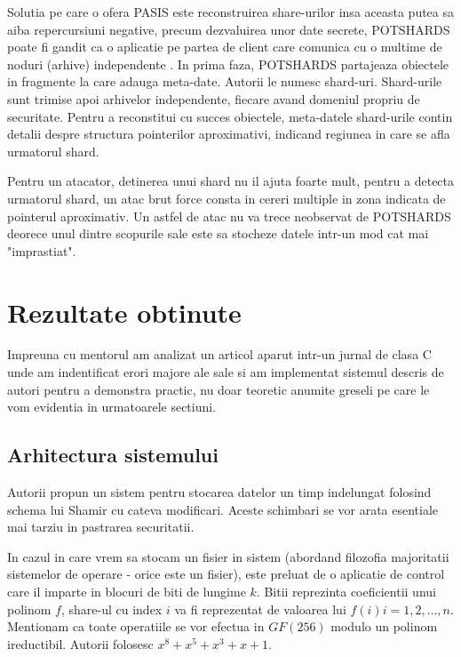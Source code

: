 \documentclass{llncs}
\begin{document}
Solutia pe care o ofera PASIS este reconstruirea share-urilor insa aceasta putea sa aiba repercursiuni negative, precum dezvaluirea unor date secrete,
POTSHARDS poate fi gandit ca o aplicatie pe partea de client care comunica cu o multime de noduri (arhive) independente . In prima faza, POTSHARDS partajeaza obiectele in fragmente la care adauga meta-date. Autorii le numesc shard-uri. Shard-urile sunt trimise apoi arhivelor independente, fiecare avand domeniul propriu de securitate. Pentru a reconstitui cu succes obiectele, meta-datele shard-urile contin detalii despre structura pointerilor aproximativi, indicand regiunea in care se afla urmatorul shard.

Pentru un atacator, detinerea unui shard nu il ajuta foarte mult, pentru a detecta urmatorul shard, un atac brut force consta in cereri multiple in zona indicata de pointerul aproximativ. Un astfel de atac nu va trece neobservat de POTSHARDS deorece unul dintre scopurile sale este sa stocheze datele intr-un mod cat mai "imprastiat".\cite{SGMV:2009} 

\section{Rezultate obtinute}
Impreuna cu mentorul am analizat un articol aparut intr-un jurnal de clasa C unde am indentificat erori majore ale sale si am implementat sistemul descris de autori pentru a demonstra practic, nu doar teoretic anumite greseli pe care le vom evidentia in urmatoarele sectiuni. \cite{AAMK:2013}

\label{sec:results}
\subsection{Arhitectura sistemului}

Autorii propun un sistem pentru stocarea datelor un timp indelungat folosind schema lui Shamir cu cateva modificari. Aceste schimbari se vor arata esentiale mai tarziu in pastrarea securitatii.

In cazul in care vrem sa stocam un fisier in sistem (abordand filozofia majoritatii sistemelor de operare - orice este un fisier), este preluat de o aplicatie de control care il imparte in blocuri de biti de lungime $k$. Bitii reprezinta coeficientii unui polinom $f$, share-ul cu index $i$ va fi reprezentat de valoarea lui $f(i) i = 1, 2, \dots, n$. Mentionam ca toate operatiile se vor efectua in $GF(256)$ modulo un polinom ireductibil.
Autorii folosesc $x^8 + x^5 + x^3 + x + 1$.
\end{document}
